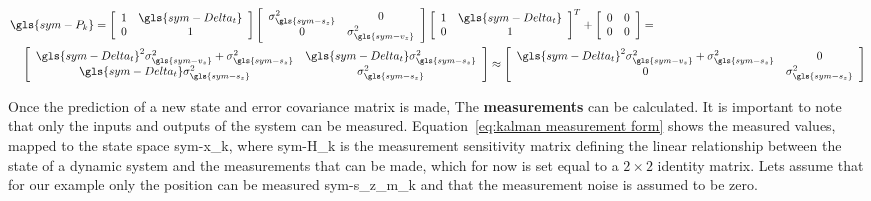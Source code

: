 \begin{equation}
    \label{eq:kalman example P}
    \begin{multlined}[b]
        \gls{sym-P_k} =
        \left[\begin{array}{cc}
                  1 & \gls{sym-Delta_t} \\
                  0 & 1
        \end{array}\right]
        \left[\begin{array}{cc}
                  \sigma_{\gls{sym-s_z} }^{2} & 0                           \\
                  0                           & \sigma_{\gls{sym-v_z} }^{2}
        \end{array}\right]
        \left[\begin{array}{cc}
                  1 & \gls{sym-Delta_t} \\
                  0 & 1
        \end{array}\right]^{T}
        +
        \left[\begin{array}{cc}
                  0 & 0 \\
                  0 & 0
        \end{array}\right]
        = \\ \left[\begin{array}{cc}
                       \gls{sym-Delta_t}^2 \sigma_{\gls{sym-v_z} }^{2} + \sigma_{\gls{sym-s_z} }^{2} & 
					   \gls{sym-Delta_t} \sigma_{\gls{sym-s_z} }^{2} \\
                       \gls{sym-Delta_t} \sigma_{\gls{sym-s_z} }^{2}                                 & 
					   \sigma_{\gls{sym-s_z} }^{2}
        \end{array}\right]
        \approx
        \left[\begin{array}{cc}
                  \gls{sym-Delta_t}^2 \sigma_{\gls{sym-v_z} }^{2} + \sigma_{\gls{sym-s_z} }^{2} & 0                  
				  \\
                  0                                                                             & 
				  \sigma_{\gls{sym-s_z} }^{2}
        \end{array}\right]
    \end{multlined}
\end{equation}

Once the prediction of a new state and error covariance matrix is made, The \textbf{measurements} can be calculated. It
is important to note that only the inputs and outputs of the system can be measured. Equation~\ref{eq:kalman measurement
form} shows the measured values, mapped to the state space \gls{sym-x_k}, where \gls{sym-H_k} is the measurement
sensitivity matrix defining the linear relationship between the state of a dynamic system and the measurements that can
be made, which for now is set equal to a \( 2 \times 2 \) identity matrix. Lets assume that for our example only the
position can be measured \gls{sym-s_z_m_k} and that the measurement noise is assumed to be zero.


